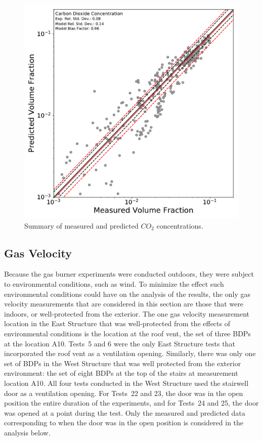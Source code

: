 \begin{figure}[!h]
	\centering
	\includegraphics[width=\columnwidth]{Figures/Plots/Validation/Gas_Concentration/loglog_CO2}
	\caption{Summary of measured and predicted $CO_2$ concentrations.}
	\label{fig:loglog_CO2}
\end{figure}

\clearpage
\subsection{Gas Velocity}
Because the gas burner experiments were conducted outdoors, they were subject to environmental conditions, such as wind. To minimize the effect such environmental conditions could have on the analysis of the results, the only gas velocity measurements that are considered in this section are those that were indoors, or well-protected from the exterior. The one gas velocity measurement location in the East Structure that was well-protected from the effects of environmental conditions is the location at the roof vent, the set of three BDPs at the location A10. Tests~5 and 6 were the only East Structure tests that incorporated the roof vent as a ventilation opening. Similarly, there was only one set of BDPs in the West Structure that was well protected from the exterior environment: the set of eight BDPs at the top of the stairs at measurement location A10. All four tests conducted in the West Structure used the stairwell door as a ventilation opening. For Tests~22 and 23, the door was in the open position the entire duration of the experiments, and for Tests~24 and 25, the door was opened at a point during the test. Only the measured and predicted data corresponding to when the door was in the open position is considered in the analysis below. 

